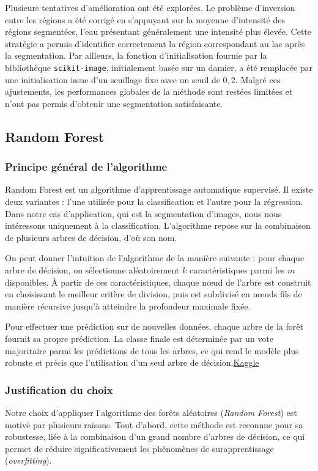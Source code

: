 \documentclass[11pt,a4paper]{article}
\begin{document}
Plusieurs tentatives d’amélioration ont été explorées. Le problème d’inversion entre les régions a été corrigé en s’appuyant sur la moyenne d’intensité des régions segmentées, l’eau présentant généralement une intensité plus élevée. Cette stratégie a permis d’identifier correctement la région correspondant au lac après la segmentation. Par ailleurs, la fonction d’initialisation fournie par la bibliothèque \texttt{scikit-image}, initialement basée sur un damier, a été remplacée par une initialisation issue d’un seuillage fixe avec un seuil de $0{,}2$. Malgré ces ajustements, les performances globales de la méthode sont restées limitées et n’ont pas permis d’obtenir une segmentation satisfaisante.

\subsection{Random Forest}
\subsubsection{Principe général de l’algorithme
}
Random Forest est un algorithme d’apprentissage automatique supervisé. Il existe deux variantes : l’une utilisée pour la classification et l’autre pour la régression. Dans notre cas d’application, qui est la segmentation d’images, nous nous intéressons uniquement à la classification. L’algorithme repose sur la combinaison de plusieurs arbres de décision, d’où son nom.

On peut donner l’intuition de l’algorithme de la manière suivante : pour chaque arbre de décision, on sélectionne aléatoirement $k$ caractéristiques parmi les $m$ disponibles. À partir de ces caractéristiques, chaque nœud de l’arbre est construit en choisissant le meilleur critère de division, puis est subdivisé en nœuds fils de manière récursive jusqu’à atteindre la profondeur maximale fixée. 

Pour effectuer une prédiction sur de nouvelles données, chaque arbre de la forêt fournit sa propre prédiction. La classe finale est déterminée par un vote majoritaire parmi les prédictions de tous les arbres, ce qui rend le modèle plus robuste et précis que l’utilisation d’un seul arbre de décision.\href{https://www.kaggle.com/code/prashant111/random-forest-classifier-tutorial}{Kaggle}

\subsubsection{Justification du choix}
Notre choix d’appliquer l’algorithme des forêts aléatoires (\textit{Random Forest}) est motivé par plusieurs raisons. 
Tout d’abord, cette méthode est reconnue pour sa robustesse, liée à la combinaison d’un grand nombre d’arbres de décision, 
ce qui permet de réduire significativement les phénomènes de surapprentissage (\textit{overfitting}).
\end{document}
